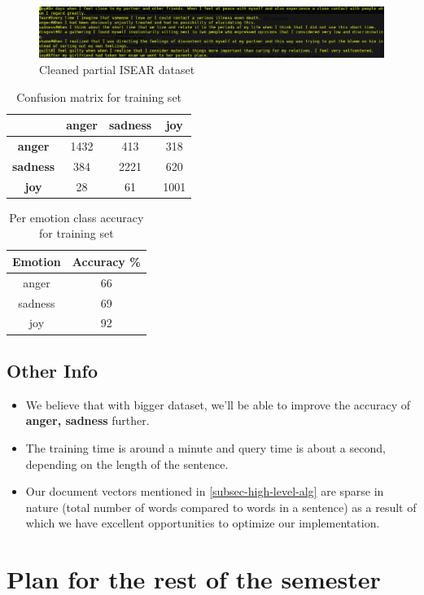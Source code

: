 \begin{center}
	\begin{figure}[ht!]
	\label{fig-clean-dataset}	
	\includegraphics[width=18cm,scale=0.5]{data.png}
	\caption{Cleaned partial ISEAR dataset}
	\end{figure}
\end{center}	
\vspace*{-0.5cm}
\begin{table}[ht!]
  \centering
  \label{tab-confusion}
  \begin{tabular}{c|c|c|c}
  & \textbf{anger} & \textbf{sadness} & \textbf{joy}\\
  \hline
  \textbf{anger} & 1432 & 413 & 318 \\
  \textbf{sadness} & 384 & 2221 & 620 \\
  \textbf{joy} & 28 & 61 & 1001 \\
  \end{tabular}
  \caption{Confusion matrix for training set}
\end{table}
\vspace*{-0.5cm}
\begin{table}[ht!]
  \centering
  \label{tab-accuracy}
  \begin{tabular}{c|c}
  \textbf{Emotion} & \textbf{Accuracy \%} \\
  \hline
  anger & 66 \\
  sadness & 69 \\
  joy & 92
  \end{tabular}
  \caption{Per emotion class accuracy for training set}
\end{table}
\subsection{Other Info}
\begin{itemize}
 \item We believe that with bigger dataset, we'll be able to improve the accuracy of \textbf{anger, sadness} further.
 \item The training time is around a minute and query time is about a second, depending on the length of the sentence.
 \item Our document vectors mentioned in \ref{subsec-high-level-alg} are sparse in nature (total number of words compared to words in a sentence) as a result of which we have excellent opportunities to optimize our implementation.
\end{itemize}
\section{Plan for the rest of the semester}

